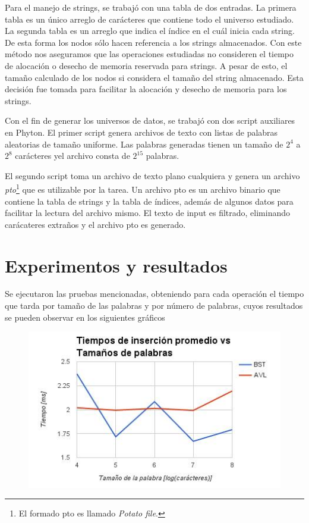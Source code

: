 \documentclass[12pt,letterpaper,hidelinks]{extarticle}
\begin{document}
Para el manejo de strings, se trabajó con una tabla de dos entradas. La primera tabla es un único arreglo de carácteres que contiene todo el universo estudiado. La segunda tabla es un arreglo que indica el índice en el cuál inicia cada string.
De esta forma los nodos sólo hacen referencia a los strings almacenados. Con este método nos aseguramos que las operaciones estudiadas no consideren el tiempo de alocación o desecho de memoria reservada para strings.
A pesar de esto, el tamaño calculado de los nodos si considera el tamaño del string almacenado.
Esta decisión fue tomada para facilitar la alocación y desecho de memoria para los strings.

Con el fin de generar los universos de datos, se trabajó con dos script auxiliares en Phyton.
El primer script genera archivos de texto con listas de palabras aleatorias de tamaño uniforme. Las palabras generadas tienen un tamaño de $2^4$ a $2^8$ carácteres yel archivo consta de $2^{15}$ palabras.

El segundo script toma un archivo de texto plano cualquiera y genera un archivo \textit{pto}\footnote{El formado pto es llamado \textit{Potato file}.} que es utilizable por la tarea.
Un archivo pto es un archivo binario que contiene la tabla de strings y la tabla de índices, además de algunos datos para facilitar la lectura del archivo mismo.
El texto de input es filtrado, eliminando carácateres extraños y el archivo pto es generado.


\section{Experimentos y resultados}
	Se ejecutaron las pruebas mencionadas, obteniendo para cada operación el tiempo que tarda por tamaño de las palabras y por
	número de palabras, cuyos resultados se pueden observar en los siguientes gráficos

\newpage 
	\begin{figure}[ht!]
		\centering \includegraphics[scale=0.8]{img/ins-size.jpg}
	\end{figure}
\end{document}
